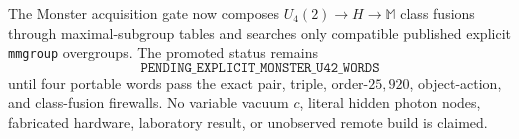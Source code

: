 The Monster acquisition gate now composes $U_4(2)\to H\to\mathbb M$ class fusions through maximal-subgroup tables and searches only compatible published explicit \texttt{mmgroup} overgroups.  The promoted status remains
\[
\boxed{\texttt{PENDING\_EXPLICIT\_MONSTER\_U42\_WORDS}}
\]
until four portable words pass the exact pair, triple, order-$25{,}920$, object-action, and class-fusion firewalls.  No variable vacuum $c$, literal hidden photon nodes, fabricated hardware, laboratory result, or unobserved remote build is claimed.
